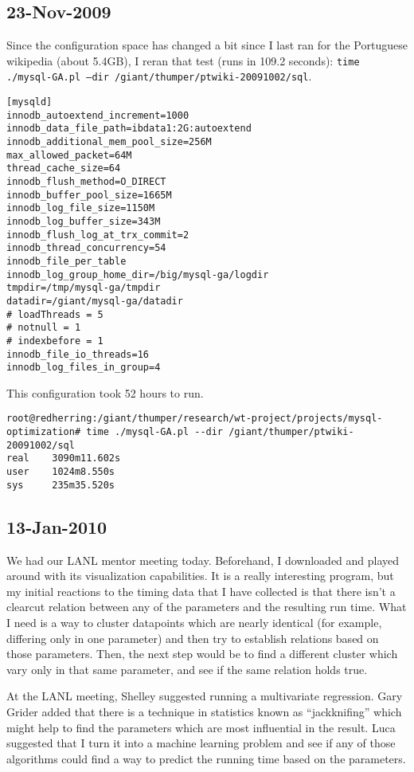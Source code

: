 \subsection{23-Nov-2009}

Since the configuration space has changed a bit since I last ran for
the Portuguese wikipedia (about 5.4GB), I reran that test (runs in 109.2 seconds):
\texttt{time ./mysql-GA.pl --dir /giant/thumper/ptwiki-20091002/sql}.

\begin{verbatim}
[mysqld]
innodb_autoextend_increment=1000
innodb_data_file_path=ibdata1:2G:autoextend
innodb_additional_mem_pool_size=256M
max_allowed_packet=64M
thread_cache_size=64
innodb_flush_method=O_DIRECT
innodb_buffer_pool_size=1665M
innodb_log_file_size=1150M
innodb_log_buffer_size=343M
innodb_flush_log_at_trx_commit=2
innodb_thread_concurrency=54
innodb_file_per_table
innodb_log_group_home_dir=/big/mysql-ga/logdir
tmpdir=/tmp/mysql-ga/tmpdir
datadir=/giant/mysql-ga/datadir
# loadThreads = 5
# notnull = 1
# indexbefore = 1
innodb_file_io_threads=16
innodb_log_files_in_group=4
\end{verbatim}

This configuration took 52 hours to run.
\begin{verbatim}
root@redherring:/giant/thumper/research/wt-project/projects/mysql-optimization# time ./mysql-GA.pl --dir /giant/thumper/ptwiki-20091002/sql
real    3090m11.602s
user    1024m8.550s
sys     235m35.520s
\end{verbatim}

\subsection{13-Jan-2010}

We had our LANL mentor meeting today.
Beforehand, I downloaded  and played around with
its visualization capabilities.
It is a really interesting program, but my initial reactions to the
\mysql timing data that I have collected is that there isn't a clearcut
relation between any of the parameters and the resulting run time.
What I need is a way to cluster datapoints which are nearly identical
(for example, differing only in one parameter) and then try to establish
relations based on those parameters.
Then, the next step would be to find a different cluster which vary
only in that same parameter, and see if the same relation holds true.

At the LANL meeting, Shelley suggested running a multivariate
regression.
Gary Grider added that there is a technique in statistics known
as ``jackknifing'' which might help to find the parameters
which are most influential in the result.
Luca suggested that I turn it into a machine learning problem
and see if any of those algorithms could find a way to predict
the running time based on the parameters.

